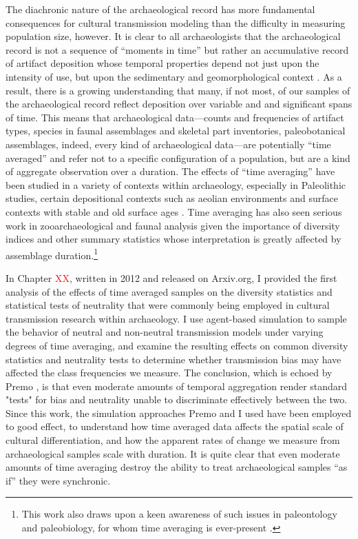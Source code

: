 The diachronic nature of the archaeological record has more fundamental consequences for cultural transmission modeling than the difficulty in measuring population size, however.   It is clear to all archaeologists that the archaeological record is not a sequence of ``moments in time'' but rather an accumulative record of artifact deposition whose temporal properties depend not just upon the intensity of use, but upon the sedimentary and geomorphological context \citep{schiffer1983toward,Schiffer1987,stein2001review,Stein1987,Stein1993,stein2001review,stein2003big}.  As a result, there is a growing understanding that many, if not most, of our samples of the archaeological record reflect deposition over variable and and significant spans of time.  This means that archaeological data---counts and frequencies of artifact types, species in faunal assemblages and skeletal part inventories, paleobotanical assemblages, indeed, every kind of archaeological data---are potentially ``time averaged'' and refer not to a specific configuration of a population, but are a kind of aggregate observation over a duration.  
The effects of ``time averaging'' have been studied in a variety of contexts within archaeology, especially in Paleolithic studies, certain depositional contexts such as aeolian environments and surface contexts with stable and old surface ages .  Time averaging has also seen serious work in zooarchaeological and faunal analysis \citep{broughton1993diet,Grayson1998,Lyman2003} given the importance of diversity indices and other summary statistics whose interpretation is greatly affected by assemblage duration.\footnote{This work also draws upon a keen awareness of such issues in paleontology and paleobiology, for whom time averaging is ever-present \citep{kidwell1997time,olszewski1997influence,Olszewski1999,olszewski2004modeling}.}  

In Chapter \textcolor{red}{XX}, written in 2012 and released on Arxiv.org, I provided the first analysis of the effects of time averaged samples on the diversity statistics and statistical tests of neutrality that were commonly being employed in cultural transmission research within archaeology.  I use agent-based simulation to sample the behavior of neutral and non-neutral transmission models under varying degrees of time averaging, and examine the resulting effects on common diversity statistics and neutrality tests to determine whether transmission bias may have affected the class frequencies we measure.  The conclusion, which is echoed by Premo \citeyearpar{Premo2014}, is that even moderate amounts of temporal aggregation render standard "tests" for bias and neutrality unable to discriminate effectively between the two.  Since this work, the simulation approaches Premo and I used have been employed to good effect, to understand how time averaged data affects the spatial scale of cultural differentiation, and how the apparent rates of change we measure from archaeological samples scale with duration\citep{miller2018time,perreault2018time}.  It is quite clear that even moderate amounts of time averaging destroy the ability to treat archaeological samples ``as if'' they were synchronic.  

